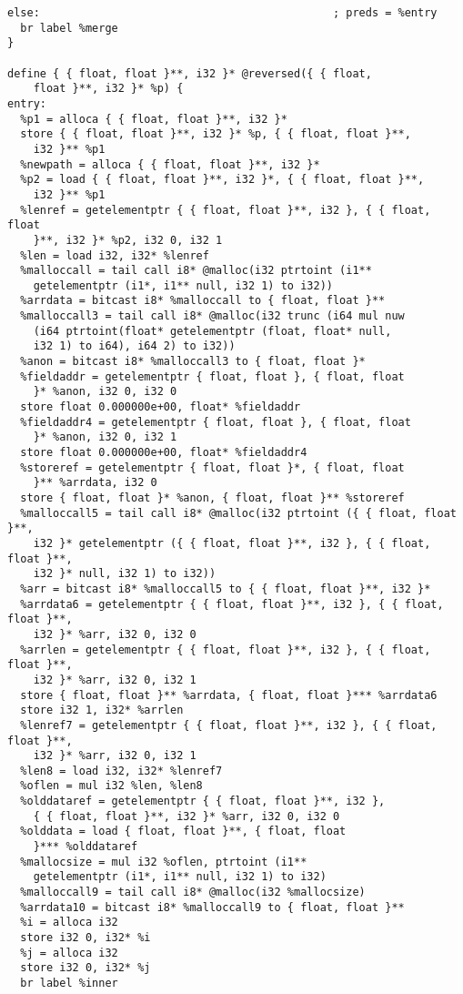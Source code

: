 \documentclass[main.tex]{subfiles}
\begin{document}
{\begin{lstlisting}
else:                                             ; preds = %entry
  br label %merge
}

define { { float, float }**, i32 }* @reversed({ { float, 
    float }**, i32 }* %p) {
entry:
  %p1 = alloca { { float, float }**, i32 }*
  store { { float, float }**, i32 }* %p, { { float, float }**,
    i32 }** %p1
  %newpath = alloca { { float, float }**, i32 }*
  %p2 = load { { float, float }**, i32 }*, { { float, float }**,
    i32 }** %p1
  %lenref = getelementptr { { float, float }**, i32 }, { { float, float 
    }**, i32 }* %p2, i32 0, i32 1
  %len = load i32, i32* %lenref
  %malloccall = tail call i8* @malloc(i32 ptrtoint (i1**
    getelementptr (i1*, i1** null, i32 1) to i32))
  %arrdata = bitcast i8* %malloccall to { float, float }**
  %malloccall3 = tail call i8* @malloc(i32 trunc (i64 mul nuw 
    (i64 ptrtoint(float* getelementptr (float, float* null,
    i32 1) to i64), i64 2) to i32))
  %anon = bitcast i8* %malloccall3 to { float, float }*
  %fieldaddr = getelementptr { float, float }, { float, float
    }* %anon, i32 0, i32 0
  store float 0.000000e+00, float* %fieldaddr
  %fieldaddr4 = getelementptr { float, float }, { float, float
    }* %anon, i32 0, i32 1
  store float 0.000000e+00, float* %fieldaddr4
  %storeref = getelementptr { float, float }*, { float, float
    }** %arrdata, i32 0
  store { float, float }* %anon, { float, float }** %storeref
  %malloccall5 = tail call i8* @malloc(i32 ptrtoint ({ { float, float }**, 
    i32 }* getelementptr ({ { float, float }**, i32 }, { { float, float }**, 
    i32 }* null, i32 1) to i32))
  %arr = bitcast i8* %malloccall5 to { { float, float }**, i32 }*
  %arrdata6 = getelementptr { { float, float }**, i32 }, { { float, float }**, 
    i32 }* %arr, i32 0, i32 0
  %arrlen = getelementptr { { float, float }**, i32 }, { { float, float }**, 
    i32 }* %arr, i32 0, i32 1
  store { float, float }** %arrdata, { float, float }*** %arrdata6
  store i32 1, i32* %arrlen
  %lenref7 = getelementptr { { float, float }**, i32 }, { { float, float }**, 
    i32 }* %arr, i32 0, i32 1
  %len8 = load i32, i32* %lenref7
  %oflen = mul i32 %len, %len8
  %olddataref = getelementptr { { float, float }**, i32 },
    { { float, float }**, i32 }* %arr, i32 0, i32 0
  %olddata = load { float, float }**, { float, float 
    }*** %olddataref
  %mallocsize = mul i32 %oflen, ptrtoint (i1** 
    getelementptr (i1*, i1** null, i32 1) to i32)
  %malloccall9 = tail call i8* @malloc(i32 %mallocsize)
  %arrdata10 = bitcast i8* %malloccall9 to { float, float }**
  %i = alloca i32
  store i32 0, i32* %i
  %j = alloca i32
  store i32 0, i32* %j
  br label %inner


\end{lstlisting}}
\end{document}
